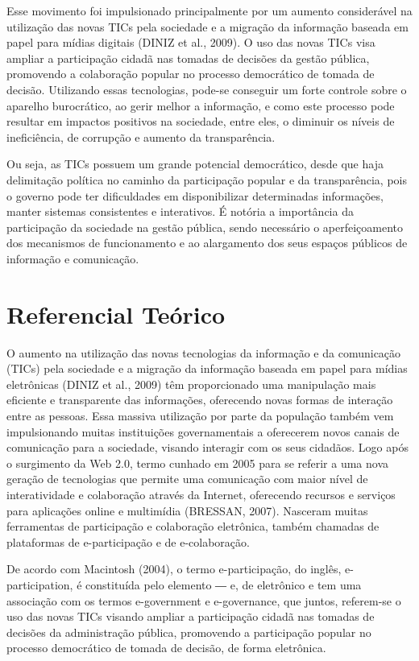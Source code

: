 \documentclass[12pt]{article}
\begin{document}
Esse movimento foi impulsionado principalmente por um aumento considerável na utilização das novas TICs pela sociedade e a migração da informação baseada em papel para mídias digitais (DINIZ et al., 2009). O uso das novas TICs visa ampliar a participação cidadã nas tomadas de decisões da gestão pública, promovendo a colaboração popular no processo democrático de tomada de decisão. Utilizando essas tecnologias, pode-se conseguir um forte controle sobre o aparelho burocrático, ao gerir melhor a informação, e como este processo pode resultar em impactos positivos na sociedade, entre eles, o diminuir os níveis de ineficiência, de corrupção e aumento da transparência.

Ou seja, as TICs possuem um grande potencial democrático, desde que haja delimitação política no caminho da participação popular e da transparência, pois o governo pode ter dificuldades em disponibilizar determinadas informações, manter sistemas consistentes e interativos. É notória a importância da participação da sociedade na gestão pública, sendo necessário o aperfeiçoamento dos mecanismos de funcionamento e ao alargamento dos seus espaços públicos de informação e comunicação.

\section{Referencial Teórico}
O aumento na utilização das novas tecnologias da informação e da comunicação (TICs) pela sociedade e a migração da informação baseada em papel para mídias eletrônicas (DINIZ et al., 2009) têm proporcionado uma manipulação mais eficiente e transparente das informações, oferecendo novas formas de interação entre as pessoas. Essa massiva utilização por parte da população também vem impulsionando muitas instituições governamentais a oferecerem novos canais de comunicação para a sociedade, visando interagir com os seus cidadãos. Logo após o surgimento da Web 2.0, termo cunhado em 2005 para se referir a uma nova geração de tecnologias que permite uma comunicação com maior nível de interatividade e colaboração através da Internet, oferecendo recursos e serviços para aplicações online e multimídia (BRESSAN, 2007). Nasceram muitas ferramentas de participação e colaboração eletrônica, também chamadas de plataformas de e-participação e de e-colaboração.

De acordo com Macintosh (2004), o termo e-participação, do inglês, e-participation, é constituída pelo elemento ― e, de eletrônico e tem uma associação com os termos  e-government e e-governance, que juntos, referem-se o uso das novas TICs visando ampliar a participação cidadã nas tomadas de decisões da administração pública, promovendo a participação popular no processo democrático de tomada de decisão, de forma eletrônica.
\end{document}
